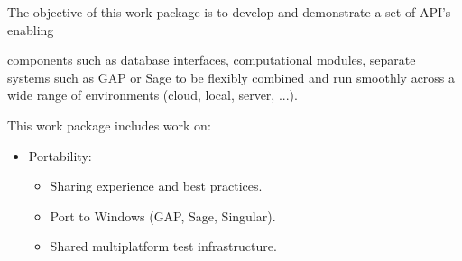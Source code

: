 \addtocounter{wpno}{1}
\begin{Workpackage}{\thewpno}
\WPTitle{\wpname{\thewpno}}

\begin{WPObjectives}
  The objective of this work package is to develop and demonstrate a
  set of API's enabling 


components such as database interfaces,
  computational modules, separate systems such as GAP or Sage to be
  flexibly combined and run smoothly across a wide range of
  environments (cloud, local, server, ...).

\end{WPObjectives}

\begin{WPDescription}
  This work package includes work on:
  \begin{itemize}
  \item Portability:
    \begin{itemize}
    \item Sharing experience and best practices.
    \item Port to Windows (GAP, Sage, Singular).
    \item Shared multiplatform test infrastructure.
    \end{itemize}


\end{itemize}
\end{WPDescription}
\end{Workpackage}
